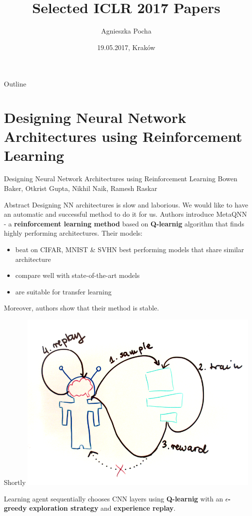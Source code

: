 \documentclass{beamer}
\title[ICLR zapłata]{Selected ICLR 2017 Papers}
\author{Agnieszka Pocha}
\institute{Jagiellonian University}
\date{19.05.2017, Kraków}
\begin{document}
\begin{frame}
  \titlepage
\end{frame}

\begin{frame}{Outline}
 \tableofcontents
\end{frame}

\section{Designing Neural Network Architectures using Reinforcement Learning}


\begin{frame}{Designing Neural Network Architectures using Reinforcement Learning}
  Bowen Baker, Otkrist Gupta, Nikhil Naik, Ramesh Raskar

  \vspace{0.1in}

  \begin{block}{Abstract}
  Designing NN architectures is slow and laborious. We would like to have an automatic and successful method to do it for us.\vspace{0.05in}
  Authors introduce MetaQNN - a \textbf{reinforcement learning method} based on \textbf{Q-learnig} algorithm that finds highly performing architectures.\vspace{0.05in}
  Their models:
  \begin{itemize}
  \item beat on CIFAR, MNIST \& SVHN best performing models that share similar architecture
  \item compare well with state-of-the-art models
  \item are suitable for transfer learning
  \end{itemize}
  Moreover, authors show that their method is stable.

  \end{block}
\end{frame}


\begin{frame}{Shortly}
  \includegraphics[width=0.9\textwidth]{model.png}

  Learning agent sequentially chooses CNN layers using \textbf{Q-learnig} with an \textbf{$\epsilon$-greedy exploration strategy} and \textbf{experience replay}.
\end{frame}
\end{document}

